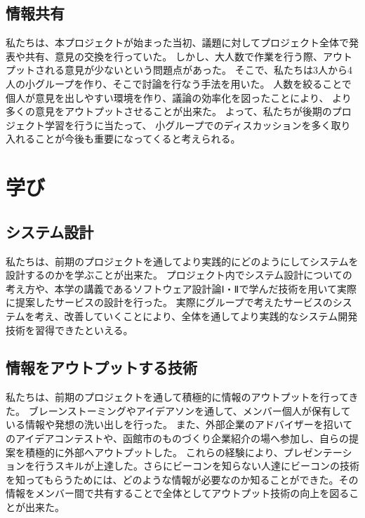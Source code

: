 \documentclass[11pt,papersize]{jsbook}
\begin{document}
\subsection{情報共有}
私たちは、本プロジェクトが始まった当初、議題に対してプロジェクト全体で発表や共有、意見の交換を行っていた。
しかし、大人数で作業を行う際、アウトプットされる意見が少ないという問題点があった。
そこで、私たちは3人から4人の小グループを作り、そこで討論を行なう手法を用いた。
人数を絞ることで個人が意見を出しやすい環境を作り、議論の効率化を図ったことにより、
より多くの意見をアウトプットさせることが出来た。
よって、私たちが後期のプロジェクト学習を行うに当たって、
小グループでのディスカッションを多く取り入れることが今後も重要になってくると考えられる。

\section{学び}

\subsection{システム設計}
私たちは、前期のプロジェクトを通してより実践的にどのようにしてシステムを設計するのかを学ぶことが出来た。
プロジェクト内でシステム設計についての考え方や、本学の講義であるソフトウェア設計論Ⅰ・Ⅱで学んだ技術を用いて実際に提案したサービスの設計を行った。
実際にグループで考えたサービスのシステムを考え、改善していくことにより、全体を通してより実践的なシステム開発技術を習得できたといえる。

\subsection{情報をアウトプットする技術}
 私たちは、前期のプロジェクトを通して積極的に情報のアウトプットを行ってきた。
ブレーンストーミングやアイデアソンを通して、メンバー個人が保有している情報や発想の洗い出しを行った。
また、外部企業のアドバイザーを招いてのアイデアコンテストや、函館市のものづくり企業紹介の場へ参加し、自らの提案を積極的に外部へアウトプットした。
これらの経験により、プレゼンテーションを行うスキルが上達した。さらにビーコンを知らない人達にビーコンの技術を知ってもらうためには、どのような情報が必要なのか知ることができた。その情報をメンバー間で共有することで全体としてアウトプット技術の向上を図ることが出来た。 
\end{document}

